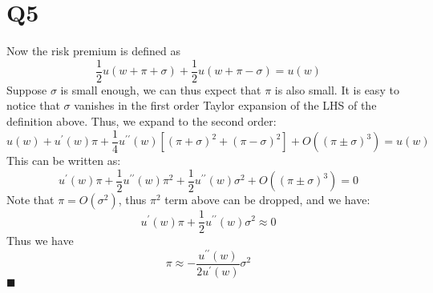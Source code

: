 \documentclass{article}
\begin{document}
	\section*{Q5}
	Now the risk premium is defined as
\begin{equation}
	\frac{1}{2}u(w+\pi+\sigma) + \frac{1}{2}u(w+\pi-\sigma) = u(w)
\end{equation}
Suppose $\sigma$ is small enough, we can thus expect that $\pi$ is also small. It is easy to notice that $\sigma$ vanishes in the first order Taylor expansion of the LHS of the definition above. Thus, we expand to the second order:
\begin{equation}
	u(w) + u^{\prime}(w) \pi + \frac{1}{4}u^{\prime\prime}(w)\left[ (\pi+\sigma)^2 + (\pi-\sigma)^2 \right] + O((\pi\pm \sigma)^3) = u(w)
\end{equation}
This can be written as:
\begin{equation}
	u^{\prime}(w) \pi + \frac{1}{2}u^{\prime\prime}(w)\pi^2 + \frac{1}{2}u^{\prime\prime}(w)\sigma^2 + O((\pi \pm \sigma)^3) = 0
\end{equation}
Note that $\pi =O(\sigma ^2)$, thus $\pi^2$ term above can be dropped, and we have:
\begin{equation}
	u^{\prime}(w) \pi  + \frac{1}{2}u^{\prime\prime}(w)\sigma^2 \approx 0
\end{equation}
Thus we have
\begin{equation}
	\pi \approx -\frac{u^{\prime\prime}(w)}{2 u^{\prime}(w)}\sigma^2
\end{equation}
$\blacksquare$
% 
\end{document}
